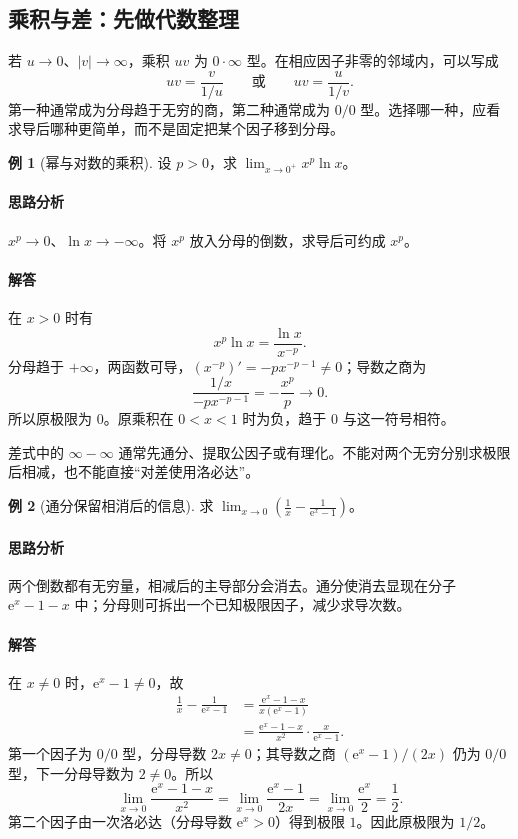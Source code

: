 \documentclass[UTF8,fontset=fandol,12pt,oneside,openany]{ctexrep}
\newcommand{\ee}{\mathrm e}
\theoremstyle{definition}
\newtheorem{example}{例}[chapter]
\begin{document}
\subsection{乘积与差：先做代数整理}

若 $u\to0$、$|v|\to\infty$，乘积 $uv$ 为 $0\cdot\infty$ 型。在相应因子非零的邻域内，可以写成
\[
uv=\frac{v}{1/u}\qquad\text{或}\qquad uv=\frac{u}{1/v}.
\]
第一种通常成为分母趋于无穷的商，第二种通常成为 $0/0$ 型。选择哪一种，应看求导后哪种更简单，而不是固定把某个因子移到分母。

\begin{example}[幂与对数的乘积]
设 $p>0$，求 $\displaystyle\lim_{x\to0^+}x^p\ln x$。
\end{example}
\paragraph{思路分析}
$x^p\to0$、$\ln x\to-\infty$。将 $x^p$ 放入分母的倒数，求导后可约成 $x^p$。
\paragraph{解答}
在 $x>0$ 时有
\[
x^p\ln x=\frac{\ln x}{x^{-p}}.
\]
分母趋于 $+\infty$，两函数可导，$(x^{-p})'=-px^{-p-1}\ne0$；导数之商为
\[
\frac{1/x}{-px^{-p-1}}=-\frac{x^p}{p}\to0.
\]
所以原极限为 $0$。原乘积在 $0<x<1$ 时为负，趋于 $0$ 与这一符号相符。

差式中的 $\infty-\infty$ 通常先通分、提取公因子或有理化。不能对两个无穷分别求极限后相减，也不能直接“对差使用洛必达”。

\begin{example}[通分保留相消后的信息]
求 $\displaystyle\lim_{x\to0}\left(\frac1x-\frac1{\ee^x-1}\right)$。
\end{example}
\paragraph{思路分析}
两个倒数都有无穷量，相减后的主导部分会消去。通分使消去显现在分子 $\ee^x-1-x$ 中；分母则可拆出一个已知极限因子，减少求导次数。
\paragraph{解答}
在 $x\ne0$ 时，$\ee^x-1\ne0$，故
\begin{align*}
\frac1x-\frac1{\ee^x-1}
&=\frac{\ee^x-1-x}{x(\ee^x-1)}\\
&=\frac{\ee^x-1-x}{x^2}\cdot\frac{x}{\ee^x-1}.
\end{align*}
第一个因子为 $0/0$ 型，分母导数 $2x\ne0$；其导数之商 $(\ee^x-1)/(2x)$ 仍为 $0/0$ 型，下一分母导数为 $2\ne0$。所以
\[
\lim_{x\to0}\frac{\ee^x-1-x}{x^2}
=\lim_{x\to0}\frac{\ee^x-1}{2x}
=\lim_{x\to0}\frac{\ee^x}{2}=\frac12.
\]
第二个因子由一次洛必达（分母导数 $\ee^x>0$）得到极限 $1$。因此原极限为 $1/2$。
\end{document}

